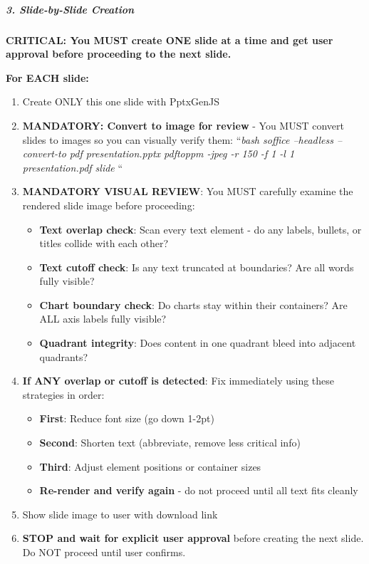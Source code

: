 \documentclass[11pt]{article}
\begin{document}
\subparagraph{3. Slide-by-Slide Creation}\mbox{}\par
\textbf{CRITICAL: You MUST create ONE slide at a time and get user approval before proceeding to the next slide.}


\textbf{For EACH slide:}

\begin{enumerate}[leftmargin=*,itemsep=2pt,topsep=2pt]
\item {} Create ONLY this one slide with PptxGenJS
\item {} \textbf{MANDATORY: Convert to image for review} - You MUST convert slides to images so you can visually verify them: ``\emph{bash soffice --headless --convert-to pdf presentation.pptx pdftoppm -jpeg -r 150 -f 1 -l 1 presentation.pdf slide }``
\item {} \textbf{MANDATORY VISUAL REVIEW}: You MUST carefully examine the rendered slide image before proceeding:
\begin{itemize}[leftmargin=*,itemsep=2pt,topsep=2pt]
\item {} \textbf{Text overlap check}: Scan every text element - do any labels, bullets, or titles collide with each other?
\item {} \textbf{Text cutoff check}: Is any text truncated at boundaries? Are all words fully visible?
\item {} \textbf{Chart boundary check}: Do charts stay within their containers? Are ALL axis labels fully visible?
\item {} \textbf{Quadrant integrity}: Does content in one quadrant bleed into adjacent quadrants?
\end{itemize}
\item {} \textbf{If ANY overlap or cutoff is detected}: Fix immediately using these strategies in order:
\begin{itemize}[leftmargin=*,itemsep=2pt,topsep=2pt]
\item {} \textbf{First}: Reduce font size (go down 1-2pt)
\item {} \textbf{Second}: Shorten text (abbreviate, remove less critical info)
\item {} \textbf{Third}: Adjust element positions or container sizes
\item {} \textbf{Re-render and verify again} - do not proceed until all text fits cleanly
\end{itemize}
\item {} Show slide image to user with download link
\item {} \textbf{STOP and wait for explicit user approval} before creating the next slide. Do NOT proceed until user confirms.
\end{enumerate}
\end{document}
